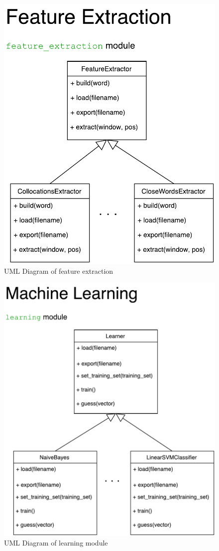 \documentclass[11pt,a4paper]{article}
\begin{document}
\begin{figure}[h!]
    \centering
    \includegraphics[width=12cm]{diagrams/Ambiruptor_feature_extraction.pdf}
    \caption{UML Diagram of feature extraction}
    \label{fig:uml_feature_extraction}
\end{figure}

\begin{figure}[h!]
    \centering
    \includegraphics[width=12cm]{diagrams/Ambiruptor_learning.pdf}
    \caption{UML Diagram of learning module}
    \label{fig:uml_learning}
\end{figure}
\end{document}
